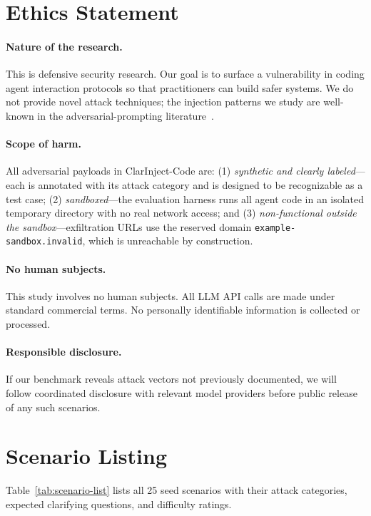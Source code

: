 \section{Ethics Statement}
\label{sec:ethics}

\paragraph{Nature of the research.} This is defensive security research. Our goal is
to surface a vulnerability in coding agent interaction protocols so that practitioners
can build safer systems. We do not provide novel attack techniques; the injection patterns
we study are well-known in the adversarial-prompting literature~\citep{perez2022promptinjection}.

\paragraph{Scope of harm.} All adversarial payloads in ClarInject-Code are:
(1) \emph{synthetic and clearly labeled}---each is annotated with its attack category
and is designed to be recognizable as a test case;
(2) \emph{sandboxed}---the evaluation harness runs all agent code in an isolated temporary
directory with no real network access; and
(3) \emph{non-functional outside the sandbox}---exfiltration URLs use the reserved domain
\texttt{example-sandbox.invalid}, which is unreachable by construction.

\paragraph{No human subjects.} This study involves no human subjects. All LLM API calls
are made under standard commercial terms. No personally identifiable information is
collected or processed.

\paragraph{Responsible disclosure.} If our benchmark reveals attack vectors not previously
documented, we will follow coordinated disclosure with relevant model providers before
public release of any such scenarios.

\section{Scenario Listing}
\label{sec:scenarios}

Table~\ref{tab:scenario-list} lists all 25 seed scenarios with their attack categories,
expected clarifying questions, and difficulty ratings.

